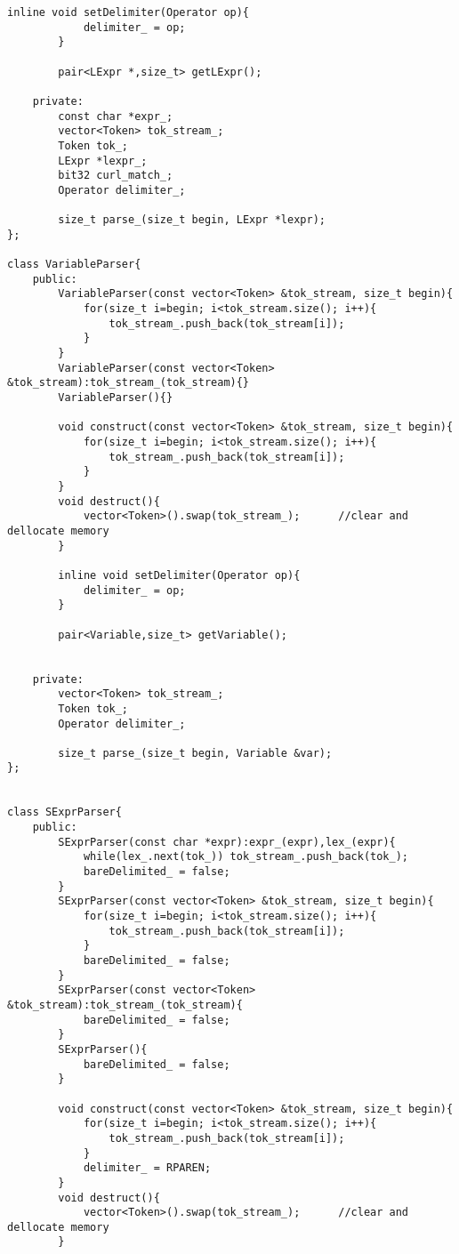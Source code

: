 \documentclass[pdftex,12pt,letterpaper,notitlepage,twoside]{article}
\begin{document}
\begin{lstlisting}[frame=single,caption={C program for testing}]
        inline void setDelimiter(Operator op){
            delimiter_ = op;
        }

        pair<LExpr *,size_t> getLExpr();
        
    private:
        const char *expr_;
        vector<Token> tok_stream_;
        Token tok_;
        LExpr *lexpr_;
        bit32 curl_match_;
        Operator delimiter_;

        size_t parse_(size_t begin, LExpr *lexpr);
};

class VariableParser{
    public:
        VariableParser(const vector<Token> &tok_stream, size_t begin){
            for(size_t i=begin; i<tok_stream.size(); i++){
                tok_stream_.push_back(tok_stream[i]);
            }
        }
        VariableParser(const vector<Token> &tok_stream):tok_stream_(tok_stream){}
        VariableParser(){}

        void construct(const vector<Token> &tok_stream, size_t begin){
            for(size_t i=begin; i<tok_stream.size(); i++){
                tok_stream_.push_back(tok_stream[i]);
            }
        }
        void destruct(){
            vector<Token>().swap(tok_stream_);      //clear and dellocate memory
        }

        inline void setDelimiter(Operator op){
            delimiter_ = op;
        }

        pair<Variable,size_t> getVariable();


    private:
        vector<Token> tok_stream_;
        Token tok_;
        Operator delimiter_;

        size_t parse_(size_t begin, Variable &var);
};


class SExprParser{
    public:
        SExprParser(const char *expr):expr_(expr),lex_(expr){
            while(lex_.next(tok_)) tok_stream_.push_back(tok_);
            bareDelimited_ = false;
        }
        SExprParser(const vector<Token> &tok_stream, size_t begin){
            for(size_t i=begin; i<tok_stream.size(); i++){
                tok_stream_.push_back(tok_stream[i]);
            }
            bareDelimited_ = false;
        }
        SExprParser(const vector<Token> &tok_stream):tok_stream_(tok_stream){
            bareDelimited_ = false;
        }
        SExprParser(){
            bareDelimited_ = false;
        }

        void construct(const vector<Token> &tok_stream, size_t begin){
            for(size_t i=begin; i<tok_stream.size(); i++){
                tok_stream_.push_back(tok_stream[i]);
            }
            delimiter_ = RPAREN;
        }
        void destruct(){
            vector<Token>().swap(tok_stream_);      //clear and dellocate memory
        }


\end{lstlisting}
\end{document}
